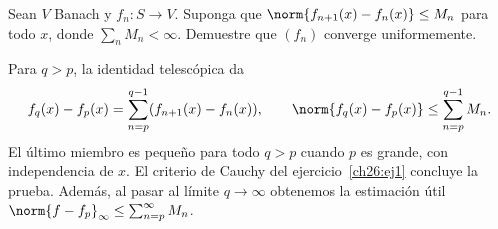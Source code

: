 \begin{ejercicio}
Sean $V$ Banach y $f_n:S\to V$. Suponga que $\norm{f_{n+1}(x)-f_n(x)}\le M_n$ para todo $x$, donde $\sum_nM_n<\infty$. Demuestre que $(f_n)$ converge uniformemente.
\end{ejercicio}
\begin{solucion}
Para $q>p$, la identidad telescópica da
\[
 f_q(x)-f_p(x)=\sum_{n=p}^{q-1}(f_{n+1}(x)-f_n(x)),
 \qquad \norm{f_q(x)-f_p(x)}\le\sum_{n=p}^{q-1}M_n.
\]
El último miembro es pequeño para todo $q>p$ cuando $p$ es grande, con independencia de $x$. El criterio de Cauchy del ejercicio~\ref{ch26:ej1} concluye la prueba. Además, al pasar al límite $q\to\infty$ obtenemos la estimación útil $\norm{f-f_p}_\infty\le\sum_{n=p}^\infty M_n$.
\end{solucion}

